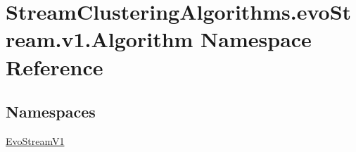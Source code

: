 \hypertarget{namespaceStreamClusteringAlgorithms_1_1evoStream_1_1v1_1_1Algorithm}{}\section{Stream\+Clustering\+Algorithms.\+evo\+Stream.\+v1.\+Algorithm Namespace Reference}
\label{namespaceStreamClusteringAlgorithms_1_1evoStream_1_1v1_1_1Algorithm}
\subsection*{Namespaces}
\begin{DoxyCompactItemize}
\item 
 \hyperlink{namespaceStreamClusteringAlgorithms_1_1evoStream_1_1v1_1_1Algorithm_1_1EvoStreamV1}{Evo\+Stream\+V1}
\end{DoxyCompactItemize}
